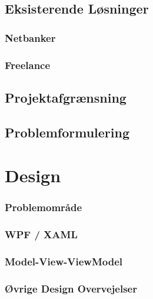 \section{Eksisterende Løsninger}
\subsection{Netbanker}

\subsection{Freelance}


\section{Projektafgrænsning}


\section{Problemformulering}


%

\chapter{Design}

\subsection{Problemområde}


\subsection{WPF / XAML}

\subsection{Model-View-ViewModel}


\subsection{Øvrige Design Overvejelser}





